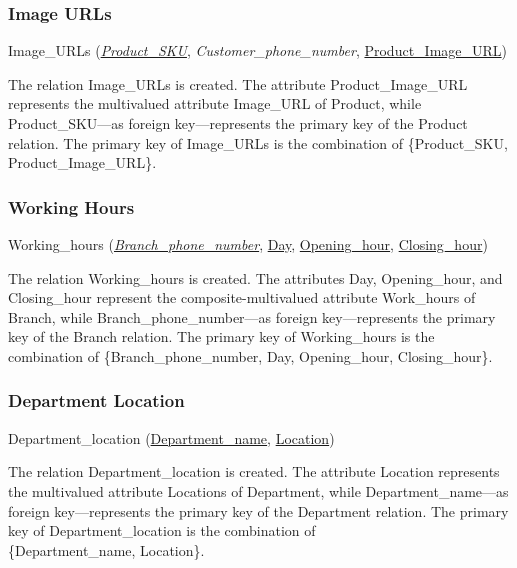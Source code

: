 \subsubsection{Image URLs}

Image\_URLs (\underline{\textit{Product\_SKU}}, \textit{Customer\_phone\_number}, \underline{Product\_Image\_URL})

The relation Image\_URLs is created. The attribute Product\_Image\_URL represents the multivalued attribute Image\_URL of Product, while Product\_SKU—as foreign key—represents the primary key of the Product relation. The primary key of Image\_URLs is the combination of \{Product\_SKU, Product\_Image\_URL\}.

\subsubsection{Working Hours}

Working\_hours (\underline{\textit{Branch\_phone\_number}}, \underline{Day}, \underline{Opening\_hour}, \underline{Closing\_hour})

The relation Working\_hours is created. The attributes Day, Opening\_hour, and Closing\_hour represent the composite-multivalued attribute Work\_hours of Branch, while Branch\_phone\_number—as foreign key—represents the primary key of the Branch relation. The primary key of Working\_hours is the combination of \{Branch\_phone\_number, Day, Opening\_hour, Closing\_hour\}.

\subsubsection{Department Location}

Department\_location (\underline{Department\_name}, \underline{Location})

The relation Department\_location is created. The attribute Location represents the multivalued attribute Locations of Department, while Department\_name—as foreign key—represents the primary key of the Department relation. The primary key of Department\_location is the combination of \\
\{Department\_name, Location\}.
